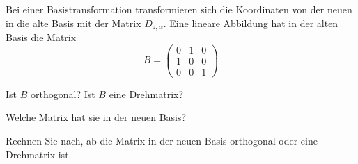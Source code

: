 Bei einer Basistransformation transformieren sich die
Koordinaten
von der neuen in die alte Basis mit der Matrix
$D_{z,\alpha}$. Eine lineare Abbildung hat
in der alten Basis die Matrix
\[
B=
\begin{pmatrix}
0&1&0\\
1&0&0\\
0&0&1
\end{pmatrix}
\]
\begin{teilaufgaben}
\item Ist $B$ orthogonal? Ist $B$ eine Drehmatrix?
\item Welche Matrix hat sie in der neuen Basis?
\item Rechnen Sie nach, ab die Matrix in der neuen Basis orthogonal oder
eine Drehmatrix ist.
\end{teilaufgaben}


